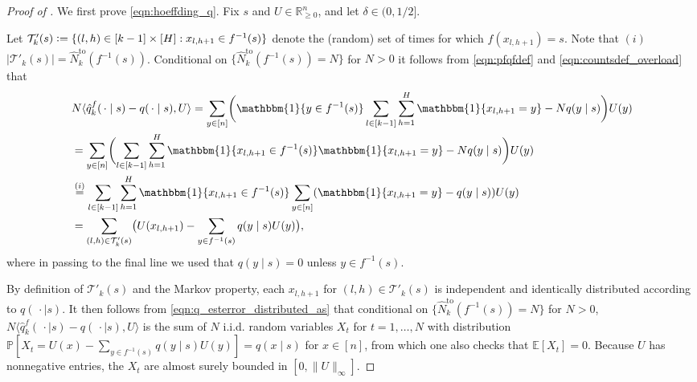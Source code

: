 \documentclass[10pt,a4paper]{amsart}
\newcommand{\eqdef}{\vcentcolon=}
\newcommand{\mbbE}{\mathbb{E}}
\newcommand{\mbbP}{\mathbb{P}}
\newcommand{\mbbR}{\mathbb{R}}
\newcommand{\mcT}{\mathcal{T}}
\begin{document}
\begin{proof}[Proof of ]
	We first prove \eqref{eqn:hoeffding_q}.
	Fix $s$ and $U\in\mbbR^n_{\geq0}$, and let $\delta\in(0,1/2]$.

	Let $\mcT'_k(s) \eqdef \{(l,h)\in [k-1]\times [H]: x_{l,h+1}\in f^{-1}(s)\}$ denote the (random) set of times for which $f(x_{l,h+1})=s$.
	Note that $(i)$ $|\mcT'_k(s)|=\hat{N}_k^{\mathrm{to}}(f^{-1}(s))$.
	Conditional on $\{\hat{N}_k^{\mathrm{to}}(f^{-1}(s))=N\}$ for $N>0$ it follows from \eqref{eqn:pfqfdef} and \eqref{eqn:countsdef_overload} that
	\begin{align}
		 &
		N\langle \hat{q}^f_k(\,\cdot \mid s)-q(\,\cdot \mid s), U\rangle
		=
		\sum_{y\in [n]}
		\biggl(
		\mathbbm{1}\{y\in f^{-1}(s)\}\sum_{l\in[k-1]}\sum_{h=1}^H\mathbbm{1}\{x_{l,h+1}=y\}-Nq(y\mid s)
		\biggr)
		U(y)
		\nonumber
		\\
		 &
		=
		\sum_{y\in [n]}
		\biggl(\sum_{l\in[k-1]}\sum_{h=1}^H
		\mathbbm{1}\{x_{l,h+1}\in f^{-1}(s)\}\mathbbm{1}\{x_{l,h+1}=y\}-Nq(y\mid s)
		\biggr)
		U(y)
		\nonumber
		\\
		 &
		\overset{(i)}{=}
		\sum_{l\in[k-1]}
		\sum_{h=1}^H
		\mathbbm{1}\{x_{l,h+1} \in f^{-1}(s)\}\sum_{y\in [n]}(
		\mathbbm{1}\{x_{l,h+1}=y\}-q(y\mid s)
		)
		U(y)
		\nonumber
		\\
		 &
		=
		\sum_{(l,h)\in \mcT'_k(s)}
		\bigl(U(x_{l,h+1})-\sum_{y\in f^{-1}(s)}q(y\mid s) U(y)\bigr),
		\label{eqn:q_esterror_distributed_as}
	\end{align}
	where in passing to the final line we used that $q(y\mid s)=0$ unless $y\in f^{-1}(s)$.

	By definition of $\mcT'_k(s)$ and the Markov property, each $x_{l,h+1}$ for $(l,h)\in \mcT'_k(s)$ is independent and identically distributed according to $q(\,\cdot \mid s)$.
	It then follows from \eqref{eqn:q_esterror_distributed_as} that conditional on $\{\hat{N}^{\mathrm{to}}_k(f^{-1}(s))=N\}$ for $N>0$, $N\langle \hat{q}^f_k(\,\cdot \mid s)-q(\,\cdot \mid s), U\rangle$ is the sum of $N$ i.i.d. random variables $X_t$ for $t=1,\ldots,N$ with distribution $\mbbP[X_t = U(x)-\sum_{y\in f^{-1}(s)}q(y\mid s) U(y)]=q(x\mid s)$ for $x\in[n]$, from which one also checks that $\mbbE[X_t] = 0$.
	Because $U$ has nonnegative entries, the $X_t$ are almost surely bounded in $[0,\lVert U\rVert_{\infty}]$.


\end{proof}
\end{document}
